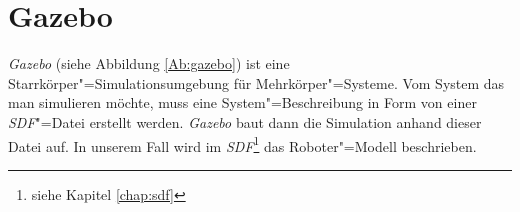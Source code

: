 %	
%	
%	
%	
%
% 	
% 
%
%
%	
%
%

\section{Gazebo}
\label{chap:gazebo}
\textit{Gazebo} (siehe Abbildung \ref{Ab:gazebo}) ist eine Starrkörper"=Simulationsumgebung für Mehrkörper"=Systeme.
Vom System das man simulieren möchte, muss eine System"=Beschreibung in Form von einer \textit{SDF}"=Datei erstellt werden.
\textit{Gazebo} baut dann die Simulation anhand dieser Datei auf. 
In unserem Fall wird im \textit{SDF}\footnote{siehe Kapitel \ref{chap:sdf}} das Roboter"=Modell beschrieben.

